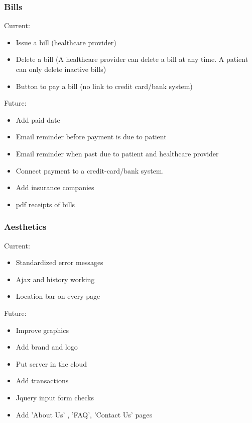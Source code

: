 \subsubsection{Bills}
Current:
\begin{itemize}
\item Issue a bill (healthcare provider)
\item Delete a bill (A healthcare provider can delete a bill at any time. A patient can only delete inactive bills)
\item Button to pay a bill (no link to credit card/bank system)
\end{itemize}
Future:
\begin{itemize}
\item Add paid date
\item Email reminder before payment is due to patient
\item Email reminder when past due to patient and healthcare provider
\item Connect payment to a credit-card/bank system.
\item Add insurance companies
\item pdf receipts of bills
\end{itemize}

\subsubsection{Aesthetics}
Current:
\begin{itemize}
\item Standardized error messages
\item Ajax and history working
\item Location bar on every page
\end{itemize}
Future: 
\begin{itemize}
\item Improve graphics
\item Add brand and logo
\item Put server in the cloud
\item Add transactions
\item Jquery input form checks
\item Add 'About Us' , 'FAQ', 'Contact Us' pages 
\end{itemize}

